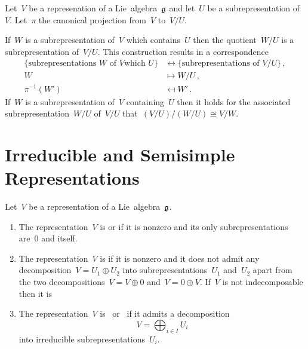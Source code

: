 \begin{proposition}
  \label{correspondence theorem!for representations}
  Let~$V$ be a represenation of a Lie~algebra~$\mathfrak{g}$ and let~$U$ be a subrepresentation of~$V$.
  Let~$\pi$ the canonical projection from~$V$ to~$V/U$.
  
  If~$W$ is a subrepresentation of~$V$ which contains~$U$ then the quotient~$W/U$ is a subrepresentation of~$V/U$.
  This construction results in a {\onetoonetext} correspondence
  \begin{align*}
    \{ \text{subrepresentations~$W$ of~$V$which~$U$} \}
    &\longleftrightarrow
    \{ \text{subrepresentations of~$V/U$} \}  \,,
    \\
    W
    &\mapsto
    W/U \,,
    \\
    \pi^{-1}(W')
    &\mapsfrom
    W'  \,.
  \end{align*}
  If~$W$ is a subrepresentation of~$V$ containing~$U$ then it holds for the associated subrepresentation~$W/U$ of~$V/U$ that~$(V/U)/(W/U) \cong V/W$.
\end{proposition}





\section{Irreducible and Semisimple Representations}


\begin{definition}
  Let~$V$ be a representation of a Lie~algebra~$\mathfrak{g}$.
  \begin{enumerate}
    \item
      The representation~$V$ is  or  if it is nonzero and its only subrepresentations are~$0$ and itself.
    \item
      The representation~$V$ is  if it is nonzero and it does not admit any decomposition~$V = U_1 \oplus U_2$ into subrepresentations~$U_1$ and~$U_2$ apart from the two decompositions~$V = V \oplus 0$ and~$V = 0 \oplus V$.
      If~$V$ is not indecomposable then it is 
    \item
      The representation~$V$ is~ or~ if it admits a decomposition
      \[
        V = \bigoplus_{i \in I} U_i
      \]
      into irreducible subrepresentations~$U_i$.
  \end{enumerate}
\end{definition}


